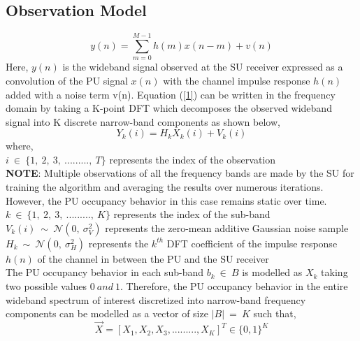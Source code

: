 \documentclass[12pt, draftcls, onecolumn]{IEEEtran}
\begin{document}
\subsection{Observation Model}
\begin{equation}\label{1}
    y(n) = \sum_{m=0}^{M-1} h(m)x(n-m) + v(n)
\end{equation}
Here, $y(n)$ is the wideband signal observed at the SU receiver expressed as a convolution of the PU signal $x(n)$ with the channel impulse response $h(n)$ added with a noise term v(n).
Equation (\ref{1}) can be written in the frequency domain by taking a K-point DFT which decomposes the observed wideband signal into K discrete narrow-band components as shown below,
\begin{equation}\label{2}
    Y_k(i) = H_kX_k(i) + V_k(i)
\end{equation}
where,
\\$i\ \in\ \{1,\ 2,\ 3,\ .........,\ T\}$ represents the index of the observation
\\\textbf{NOTE}: Multiple observations of all the frequency bands are made by the SU for training the algorithm and averaging the results over numerous iterations. However, the PU occupancy behavior in this case remains static over time.
\\$k\ \in\ \{1,\ 2,\ 3,\ .........,\ K\}$ represents the index of the sub-band
\\$V_k(i)\ \sim\ \mathcal{N}(0,\ \sigma_V^2)$ represents the zero-mean additive Gaussian noise sample
\\$H_k\ \sim\ \mathcal{N}(0,\ \sigma_H^2)$ represents the $k^{th}$ DFT coefficient of the impulse response $h(n)$ of the channel in between the PU and the SU receiver
\\The PU occupancy behavior in each sub-band $b_k\ \in\ B$ is modelled as $X_k$ taking two possible values $0\ and\ 1$. Therefore, the PU occupancy behavior in the entire wideband spectrum of interest discretized into narrow-band frequency components can be modelled as a vector of size $|B|\ =\ K$ such that,
\begin{equation}\label{3}
    \vec{X} = [X_1, X_2, X_3, ........., X_K]^T \in \{0,1\}^K
\end{equation}
\end{document}
